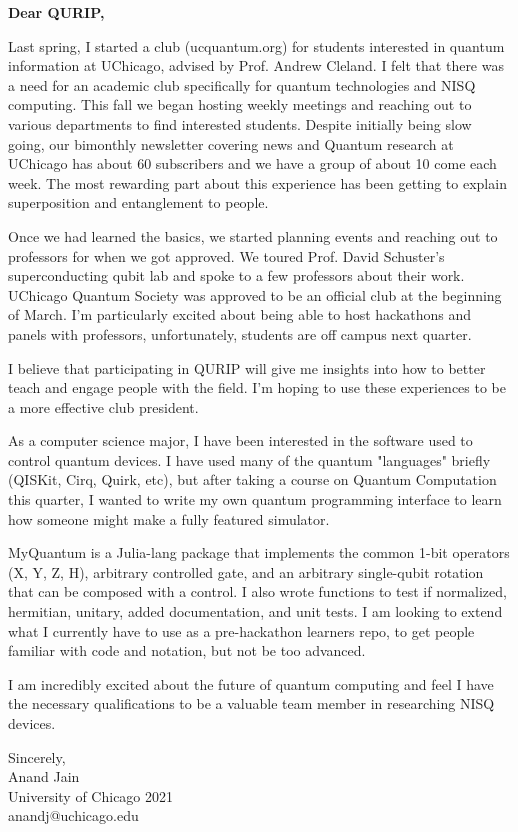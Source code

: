 \documentclass[11pt]{letter} %
\begin{document}
\begin{letter}{}

\opening{\textbf{Dear QURIP,}}

Last spring, I started a club (ucquantum.org) for students interested in quantum information at UChicago, advised by Prof. Andrew Cleland.
I felt that there was a need for an academic club specifically for quantum technologies and NISQ computing.
This fall we began hosting weekly meetings and reaching out to various departments to find interested students.
Despite initially being slow going, our bimonthly newsletter covering news and Quantum research at UChicago has about 60 subscribers and we have a group of about 10 come each week.
The most rewarding part about this experience has been getting to explain superposition and entanglement to people.
 
Once we had learned the basics, we started planning events and reaching out to professors for when we got approved.
We toured Prof. David Schuster's superconducting qubit lab and spoke to a few professors about their work.
UChicago Quantum Society was approved to be an official club at the beginning of March.
I'm particularly excited about being able to host hackathons and panels with professors, unfortunately, students are off campus next quarter.
 
I believe that participating in QURIP will give me insights into how to better teach and engage people with the field.
I'm hoping to use these experiences to be a more effective club president.
 
As a computer science major, I have been interested in the software used to control quantum devices.
I have used many of the quantum "languages" briefly (QISKit, Cirq, Quirk, etc), but after taking a course on Quantum Computation this quarter, I wanted to write my own quantum programming interface to learn how someone might make a fully featured simulator.
 
MyQuantum is a Julia-lang package that implements the common 1-bit operators (X, Y, Z, H), arbitrary controlled gate, and an arbitrary single-qubit rotation that can be composed with a control.
I also wrote functions to test if normalized, hermitian, unitary, added documentation, and unit tests.
I am looking to extend what I currently have to use as a pre-hackathon learners repo, to get people familiar with code and notation, but not be too advanced.
 
I am incredibly excited about the future of quantum computing and feel I have the necessary qualifications
to be a valuable team member in researching NISQ devices.

\begin{flushright}
    Sincerely, \\ Anand Jain \\ University of Chicago 2021 \\ anandj@uchicago.edu
\end{flushright} 

\end{letter}
 
\end{document}
